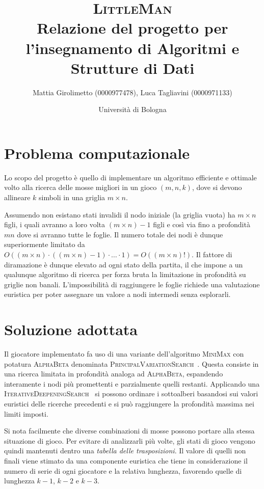 \documentclass{article}
\title{\textsc{LittleMan}\\
\large Relazione del progetto per l'insegnamento di Algoritmi e Strutture di Dati}
\author{
  Mattia Girolimetto (0000977478),
  Luca Tagliavini (0000971133)
}
\date{
	Universit\`a di Bologna \\
  \displaydate{date}
}
\begin{document}
\maketitle

\section*{Problema computazionale}

Lo scopo del progetto \`e quello di implementare un algoritmo efficiente e ottimale
volto alla ricerca delle mosse migliori in un gioco $(m,n,k)$, dove si devono
allineare $k$ simboli in una griglia $m \times n$.

Assumendo non esistano stati invalidi il nodo iniziale (la griglia vuota)
ha $m \times n$ figli, i quali avranno a loro volta $(m \times n)-1$ figli e cos\`i
via fino a profondit\`a $mn$ dove si avranno tutte le foglie. Il numero totale
dei nodi \`e dunque superiormente limitato da $O((m \times n) \cdot ((m \times n)-1)
\cdot \ldots \cdot 1) = O((m \times n)!)$.
Il fattore di diramazione \`e dunque elevato ad ogni stato della partita, il che
impone a un qualunque algoritmo di ricerca per forza bruta la limitazione in
profondit\`a su griglie non banali. L'impossibilit\`a di raggiungere le foglie
richiede una valutazione euristica per poter assegnare un valore a nodi intermedi
senza esplorarli.

\section*{Soluzione adottata}

Il giocatore implementato fa uso di una variante dell'algoritmo \textsc{MiniMax} con potatura
\textsc{AlphaBeta} denominata \textsc{PrincipalVariationSearch}~\cite{negascout}. Questa
consiste in una ricerca limitata in profondit\`a analoga ad \textsc{AlphaBeta}, espandendo 
interamente i nodi pi\`u promettenti e parzialmente quelli restanti. Applicando
una \textsc{IterativeDeepeningSearch}~\cite{id} si possono ordinare i sottoalberi
basandosi sui valori euristici delle ricerche precedenti e si pu\`o raggiungere
la profondit\`a massima nei limiti imposti.

Si nota facilmente che diverse combinazioni di mosse possono portare alla stessa 
situazione di gioco.
Per evitare di analizzarli pi\`u volte, gli stati di gioco vengono quindi mantenuti 
dentro una \emph{tabella delle trasposizioni}. Il valore di quelli non finali
viene stimato da una componente euristica che tiene in considerazione il numero
di serie di ogni giocatore e la relativa lunghezza, favorendo quelle di lunghezza
$k-1$, $k-2$ e $k-3$.
\end{document}
